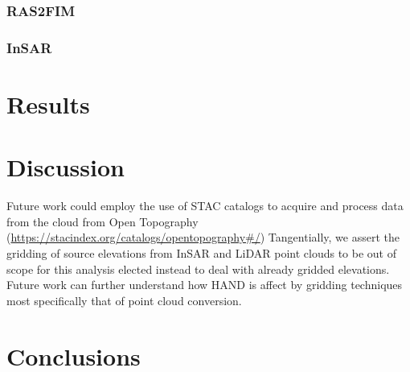 \documentclass[preprint,review,12pt]{dependencies/elsarticle}
\begin{document}
%
\subsubsection{\ac{RAS2FIM}}
\label{sssec:ras2fim}
%
%
\subsubsection{\ac{InSAR}}
\label{sssec:insar}
%
%
\section{Results}
\label{sec:results}
%

\section{Discussion}
\label{sec:discussion}
%
Future work could employ the use of STAC catalogs to acquire and process data from the cloud from Open Topography (\url{https://stacindex.org/catalogs/opentopography#/})
Tangentially, we assert the gridding of source elevations from \ac{InSAR} and \ac{LiDAR} point clouds to be out of scope for this analysis elected instead to deal with already gridded elevations.
Future work can further understand how \ac{HAND} is affect by gridding techniques most specifically that of point cloud conversion.

\section{Conclusions}
\label{sec:conclusions}
%

\acresetall 
%
\end{document}
